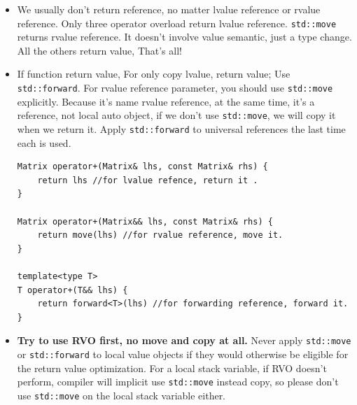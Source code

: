 \documentclass[a4paper,11pt,twoside]{book}
\begin{document}
\begin{itemize}
		\item We usually don't return reference, no matter lvalue reference or rvalue reference. Only three operator overload return lvalue reference. \texttt{std::move} returns rvalue reference. It doesn't involve value semantic, just a type change. All the others return value, That's all!
	
		\item If function return value, For only copy lvalue, return value; Use \texttt{std::forward}. For rvalue reference parameter, you should use \texttt{std::move} explicitly. Because it's name rvalue reference, at the same time, it's a reference, not local auto object, if we don't use \texttt{std::move}, we will copy it when we return it. Apply \texttt{std::forward} to universal references the last time each is used.
	
\begin{lstlisting}[numbers=none]
Matrix operator+(Matrix& lhs, const Matrix& rhs) {
	return lhs //for lvalue refence, return it .
}
	
Matrix operator+(Matrix&& lhs, const Matrix& rhs) {
	return move(lhs) //for rvalue reference, move it.
}
	
template<type T>
T operator+(T&& lhs) {
	return forward<T>(lhs) //for forwarding reference, forward it.
}
\end{lstlisting}

		\item \textbf{Try to use RVO first, no move and copy at all.} Never apply \texttt{std::move} or \texttt{std::forward} to local value objects if they would otherwise be eligible for the return value optimization. For a local stack variable, if RVO doesn't perform, compiler will implicit use \texttt{std::move} instead copy, so please don't use \texttt{std::move} on the local stack variable either.

 

\end{itemize}
\end{document}
